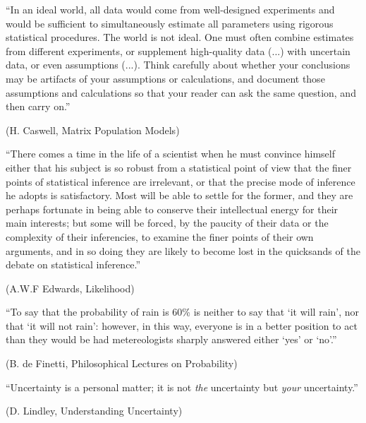 
\cleardoublepage
\null
\vfill

``In an ideal world, all data would come from well-designed experiments
and would be sufficient to simultaneously estimate all parameters using rigorous
statistical procedures. The world is not ideal. One must often combine estimates
from different experiments, or supplement high-quality data (...) with uncertain
data, or even assumptions (...). Think carefully about whether your conclusions
may be artifacts of your assumptions or calculations, and document those assumptions
and calculations so that your reader can ask the same question, and then carry on.''
\begin{flushright}
(H. Caswell, Matrix Population Models)
\end{flushright}

\vfill

``There comes a time in the life of a scientist when he must convince himself
either that his subject is so robust from a statistical point of view that
the finer points of statistical inference are irrelevant, or that the precise
mode of inference he adopts is satisfactory. Most will be able to settle for
the former, and they are perhaps fortunate in being able to conserve their
intellectual energy for their main interests; but some will be forced, by the
paucity of their data or the complexity of their inferencies, to examine
the finer points of their own arguments, and in so doing they are likely
to become lost in the quicksands of the debate on statistical inference.''
\begin{flushright}
(A.W.F Edwards, Likelihood)
\end{flushright}

\vfill

``To say that the probability of rain is 60\% is neither to say that
`it will rain', nor that `it will not rain': however, in this way,
everyone is in a better position to act than they would be had
metereologists sharply answered either `yes' or `no'.''
\begin{flushright}
(B. de Finetti, Philosophical Lectures on Probability)
\end{flushright}

\vfill

``Uncertainty is a personal matter; it is not {\em the} uncertainty but {\em your} uncertainty.''
\begin{flushright}
(D. Lindley, Understanding Uncertainty)
\end{flushright}
\vfill

\cleardoublepage

